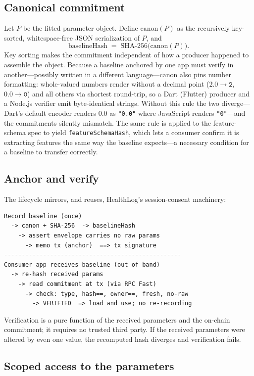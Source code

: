 \documentclass[10pt,twocolumn]{article}
\newcommand{\code}[1]{\texttt{\small #1}}
\begin{document}
\subsection{Canonical commitment}

Let $P$ be the fitted parameter object. Define
$\mathrm{canon}(P)$ as the recursively key-sorted, whitespace-free JSON
serialization of $P$, and
\[
\mathrm{baselineHash} \;=\; \mathrm{SHA\text{-}256}\big(\mathrm{canon}(P)\big).
\]
Key sorting makes the commitment independent of how a producer happened to
assemble the object. Because a baseline anchored by one app must verify in
another---possibly written in a different language---$\mathrm{canon}$ also pins
number formatting: whole-valued numbers render without a decimal point
($2.0\!\to\!\texttt{2}$, $0.0\!\to\!\texttt{0}$) and all others via shortest
round-trip, so a Dart (Flutter) producer and a Node.js verifier emit
byte-identical strings. Without this rule the two diverge---Dart's default
encoder renders $0.0$ as \code{"0.0"} where JavaScript renders \code{"0"}---and
the commitments silently mismatch. The same rule is applied to the
feature-schema spec to yield \code{featureSchemaHash}, which lets a consumer
confirm it is extracting features the same way the baseline expects---a
necessary condition for a baseline to transfer correctly.

\subsection{Anchor and verify}

The lifecycle mirrors, and reuses, HealthLog's session-consent machinery:

\begin{lstlisting}
Record baseline (once)
  -> canon + SHA-256  -> baselineHash
    -> assert envelope carries no raw params
      -> memo tx (anchor)  ==> tx signature
--------------------------------------------------
Consumer app receives baseline (out of band)
  -> re-hash received params
    -> read commitment at tx (via RPC Fast)
      -> check: type, hash==, owner==, fresh, no-raw
        -> VERIFIED  => load and use; no re-recording
\end{lstlisting}

Verification is a pure function of the received parameters and the on-chain
commitment; it requires no trusted third party. If the received parameters were
altered by even one value, the recomputed hash diverges and verification fails.

\subsection{Scoped access to the parameters}
\end{document}
